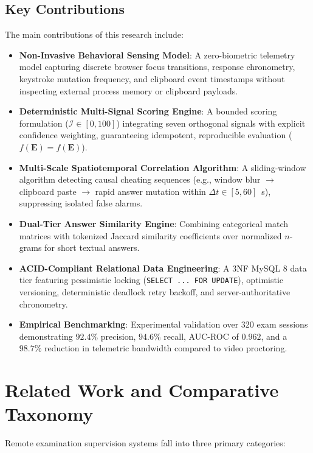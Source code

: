 \documentclass[journal]{IEEEtran}
\begin{document}
\subsection{Key Contributions}
The main contributions of this research include:
\begin{itemize}
    \item \textbf{Non-Invasive Behavioral Sensing Model}: A zero-biometric telemetry model capturing discrete browser focus transitions, response chronometry, keystroke mutation frequency, and clipboard event timestamps without inspecting external process memory or clipboard payloads.
    \item \textbf{Deterministic Multi-Signal Scoring Engine}: A bounded scoring formulation ($\mathcal{I} \in [0, 100]$) integrating seven orthogonal signals with explicit confidence weighting, guaranteeing idempotent, reproducible evaluation ($f(\mathbf{E}) = f(\mathbf{E})$).
    \item \textbf{Multi-Scale Spatiotemporal Correlation Algorithm}: A sliding-window algorithm detecting causal cheating sequences (e.g., window blur $\to$ clipboard paste $\to$ rapid answer mutation within $\Delta t \in [5, 60]$~s), suppressing isolated false alarms.
    \item \textbf{Dual-Tier Answer Similarity Engine}: Combining categorical match matrices with tokenized Jaccard similarity coefficients over normalized $n$-grams for short textual answers.
    \item \textbf{ACID-Compliant Relational Data Engineering}: A 3NF MySQL 8 data tier featuring pessimistic locking (\texttt{SELECT ... FOR UPDATE}), optimistic versioning, deterministic deadlock retry backoff, and server-authoritative chronometry.
    \item \textbf{Empirical Benchmarking}: Experimental validation over 320 exam sessions demonstrating $92.4\%$ precision, $94.6\%$ recall, AUC-ROC of $0.962$, and a $98.7\%$ reduction in telemetric bandwidth compared to video proctoring.
\end{itemize}

\section{Related Work and Comparative Taxonomy}
Remote examination supervision systems fall into three primary categories:
\end{document}
